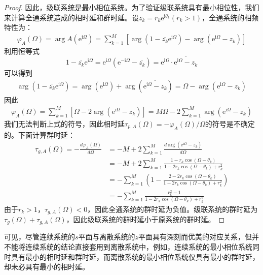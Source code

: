 \begin{proof}
    因此，级联系统是最小相位系统。为了验证级联系统具有最小相位性，我们来计算全通系统造成的相时延和群时延。设$z_k=r_k \mathrm{e}^{\mathrm{i}\theta_k}(r_k>1)$，全通系统的相频特性为：
    \begin{align*}
        \varphi_A(\Omega)=\arg A(\mathrm{e}^{\mathrm{i}\Omega})=\sum_{k=1}^{M}\left[\arg(1-\overline{z_k}\mathrm{e}^{\mathrm{i}\Omega})-\arg(\mathrm{e}^{\mathrm{i}\Omega}-z_k)\right]
    \end{align*}
    利用恒等式
    $$1-\overline{z_k} \mathrm{e}^{\mathrm{i}\Omega}=\mathrm{e}^{\mathrm{i}\Omega}(\mathrm{e}^{-\mathrm{i}\Omega}-\overline{z_k})=\mathrm{e}^{\mathrm{i}\Omega}\cdot\overline{\mathrm{e}^{\mathrm{i}\Omega}-z_k}$$
    可以得到
    \begin{align*}
        \arg(1-\overline{z_k}\mathrm{e}^{\mathrm{i}\Omega})=\arg(\mathrm{e}^{\mathrm{i}\Omega})+\arg(\overline{\mathrm{e}^{\mathrm{i}\Omega}-z_k})=\Omega-\arg(\mathrm{e}^{\mathrm{i}\Omega}-z_k)
    \end{align*}
    因此\begin{align*}
        \varphi_A(\Omega)=\sum_{k=1}^{M}\left[\Omega-2\arg(\mathrm{e}^{\mathrm{i}\Omega}-z_k)\right]=M\Omega-2\sum_{k=1}^{M}\arg(\mathrm{e}^{\mathrm{i}\Omega}-z_k)
    \end{align*}
    我们无法判断上式的符号，因此相时延$\tau_{p,A}(\Omega)=-\varphi_A(\Omega)/\Omega$的符号是不确定的。下面计算群时延：
    \begin{align*}
        \tau_{g,A}(\Omega)=-\frac{d\varphi_A(\Omega)}{d\Omega}&=-M+2\sum_{k=1}^{M}\frac{d\arg(\mathrm{e}^{\mathrm{i}\Omega}-z_k)}{d\Omega}\\
        &=-M+2\sum_{k=1}^{M}\frac{1-r_k\cos(\Omega-\theta_k)}{1-2r_k\cos(\Omega-\theta_k)+r_k^2}\\
        &=-\sum_{k=1}^{M}\left(1-\frac{2-2r_k\cos(\Omega-\theta_k)}{1-2r_k\cos(\Omega-\theta_k)+r_k^2}\right)\\
        &=-\sum_{k=1}^{M}\frac{r_k^2-1}{1-2r_k\cos(\Omega-\theta_k)+r_k^2}
    \end{align*}
    由于$r_k>1$，$\tau_{g,A}(\Omega)<0$，因此全通系统的群时延为负值。级联系统的群时延为$\tau_g(\Omega)+\tau_{g,A}(\Omega)$，因此级联系统的群时延小于原系统的群时延。
\end{proof}

可见，尽管连续系统的$s$平面与离散系统的$z$平面具有深刻而优美的对应关系，但并不能将连续系统的结论直接套用到离散系统中，例如，连续系统的最小相位系统同时具有最小的相时延和群时延，而离散系统的最小相位系统仅具有最小的群时延，却未必具有最小的相时延。
